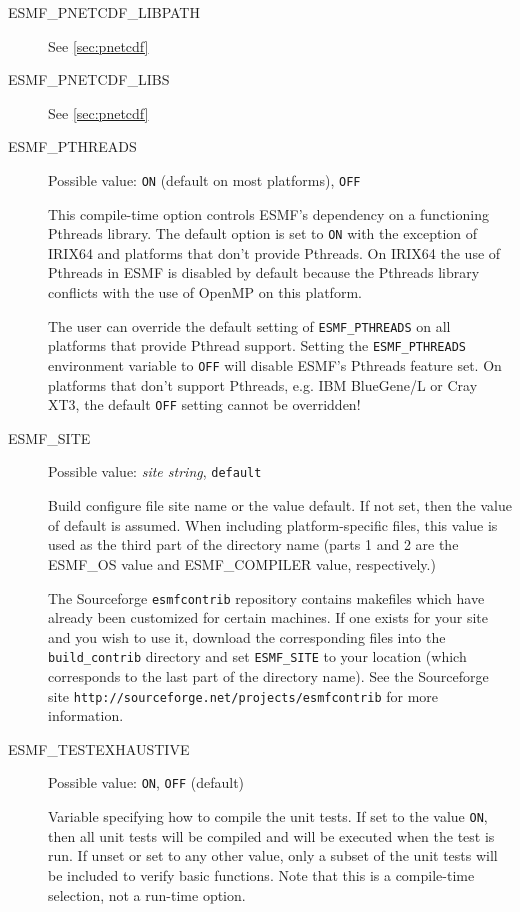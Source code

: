 \begin{description}
\item[ESMF\_PNETCDF\_LIBPATH]
See \ref{sec:pnetcdf}

\item[ESMF\_PNETCDF\_LIBS]
See \ref{sec:pnetcdf}

\item[ESMF\_PTHREADS]
Possible value: {\tt ON} (default on most platforms), {\tt OFF}

This compile-time option controls ESMF's dependency on a functioning
Pthreads library. The default option is set to {\tt ON} with the exception
of IRIX64 and platforms that don't provide Pthreads. On IRIX64 the use of
Pthreads in ESMF is disabled by default because the Pthreads library conflicts
with the use of OpenMP on this platform.

The user can override the default setting of {\tt ESMF\_PTHREADS} on all
platforms that provide Pthread support. Setting the {\tt ESMF\_PTHREADS}
environment variable to {\tt OFF} will disable ESMF's Pthreads feature set.
On platforms that don't support Pthreads, e.g. IBM BlueGene/L or Cray XT3, the
default {\tt OFF} setting cannot be overridden!
 
\item[ESMF\_SITE]
Possible value: {\em site string}, {\tt default}

Build configure file site name or the value default. If not set, then the value
of default is assumed. When including platform-specific files, this value is 
used as the third part of the directory name (parts 1 and 2 are the
ESMF\_OS value and ESMF\_COMPILER value, respectively.)

The Sourceforge {\tt esmfcontrib} repository contains makefiles which have 
already been customized for certain machines.  If one exists for your site 
and you wish to use it, download the corresponding files into the 
{\tt build\_contrib} directory and set {\tt ESMF\_SITE} to your location
(which corresponds to the last part of the directory name).  See the 
Sourceforge site {\tt http://sourceforge.net/projects/esmfcontrib} for more 
information.

\item[ESMF\_TESTEXHAUSTIVE] 
Possible value: {\tt ON}, {\tt OFF} (default)

Variable specifying how to compile the unit tests. If set to the value {\tt ON},
then all unit tests will be compiled and will be executed when the test is
run.  If unset or set to any other value, only a subset of the unit tests
will be included to verify basic functions. Note that this is a compile-time
selection, not a run-time option.


\end{description}

